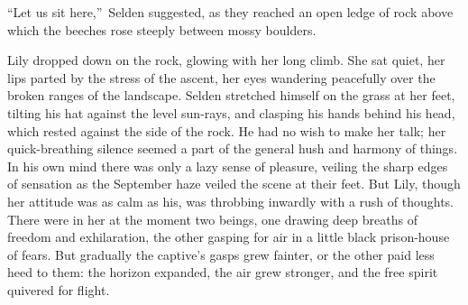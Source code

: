 \documentclass[12pt,a4paper]{book}
\begin{document}
``Let us sit here,''\ Selden suggested, as they reached an open
ledge of rock above which the beeches rose steeply between mossy
boulders.





Lily dropped down on the rock, glowing with her long climb. She
sat quiet, her lips parted by the stress of the ascent,
her eyes wandering peacefully over the broken ranges of the
landscape. Selden stretched himself on the grass at her feet,
tilting his hat against the level sun-rays, and clasping his
hands behind his head, which rested against the side of the rock. 
He had no wish to make her talk; her quick-breathing silence
seemed a part of the general hush and harmony of things. In his
own mind there was only a lazy sense of pleasure, veiling the
sharp edges of sensation as the September haze veiled the scene
at their feet. But Lily, though her attitude was as calm as his,
was throbbing inwardly with a rush of thoughts. There were in her
at the moment two beings, one drawing deep breaths of freedom and
exhilaration, the other gasping for air in a little black
prison-house of fears. But gradually the captive's gasps grew
fainter, or the other paid less heed to them: the horizon
expanded, the air grew stronger, and the free spirit quivered for
flight.
\end{document}
